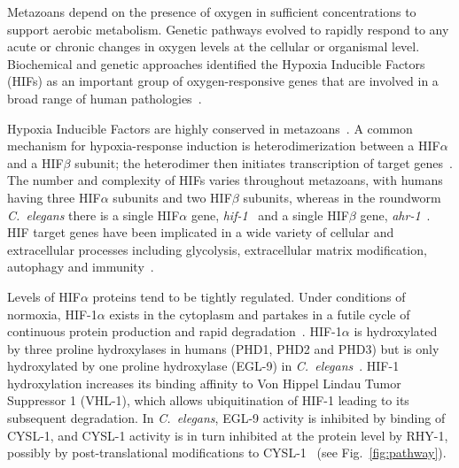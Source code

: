 \documentclass[10pt, onecolumn]{article}
\newcommand{\cel}{\emph{C.~elegans}}
\newcommand{\gene}[1]{\emph{#1}}
\newcommand{\eglp}{EGL-9}
\newcommand{\rhyp}{RHY-1}
\newcommand{\vhlp}{VHL-1}
\newcommand{\hifp}{HIF-1}
\newcommand{\cyslp}{CYSL-1}
\begin{document}
Metazoans depend on the presence of oxygen in sufficient concentrations to
support aerobic metabolism. Genetic pathways evolved to rapidly respond to any
acute or chronic changes in oxygen levels at the cellular or organismal level.
Biochemical and genetic approaches identified the Hypoxia Inducible Factors
(HIFs) as an important group of oxygen-responsive genes that are involved in a
broad range of human pathologies~\cite{Semenza2012}.

Hypoxia Inducible Factors are highly conserved in metazoans~\cite{Loenarz2011}.
A common mechanism for hypoxia-response induction is heterodimerization between a
HIF$\alpha$ and a HIF$\beta$ subunit; the heterodimer then initiates
transcription of target genes~\cite{Jiang1996}. The number and complexity of
HIFs varies throughout metazoans, with humans having three HIF$\alpha$ subunits
and two HIF$\beta$ subunits, whereas in the roundworm \cel{} there is a single
HIF$\alpha$ gene, \gene{hif-1}~\cite{Jiang2001} and a single HIF$\beta$
gene, \gene{ahr-1}~\cite{Powell-Coffman1998}. HIF target genes have been implicated
in a wide variety of cellular and extracellular processes including glycolysis,
extracellular matrix modification, autophagy and immunity~\cite{Semenza1994,
Bishop2004,Shen2005,Bellier2009,Semenza2012}.

Levels of HIF$\alpha$ proteins tend to be tightly regulated. Under conditions of
normoxia, \hifp{}$\alpha$ exists in the cytoplasm and partakes in a futile cycle
of continuous protein production and rapid degradation~\cite{Huang1996}.
\hifp{}$\alpha$ is hydroxylated by three proline hydroxylases
in humans (PHD1, PHD2 and PHD3) but is only hydroxylated by one proline
hydroxylase (\eglp{}) in \cel{}~\cite{Kaelin2008}. \hifp{} hydroxylation
increases its binding affinity to Von Hippel Lindau Tumor Suppressor 1
(\vhlp{}), which allows ubiquitination of \hifp{} leading to its subsequent
degradation. In \cel{}, \eglp{} activity is inhibited by binding of \cyslp{},
and \cyslp{} activity is in turn inhibited at the protein level by \rhyp{},
possibly by post-translational modifications to \cyslp{}~\cite{Ma2012} (see
Fig.~\ref{fig:pathway}).
\end{document}
